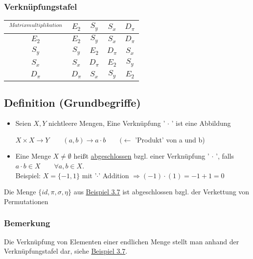 \documentclass[12pt,titlepage, pdf]{article}
\newcommand{\uline}[1]{\underline{#1}}
\renewcommand{\>}{\rightarrow}
\renewcommand{\*}{\cdot}
\begin{document}
	\\
	\\
	\subsubsection*{Verknüpfungstafel}
	\begin{tabular}{c | c c c c}
		$\overset{Matrixmultiplikation}{\cdot} $ & $E_2$ & $S_y $ & $S_x$ & $D_\pi$ \\ \hline
		$E_2$ & $E_2$ & $S_y$ & $S_x$ & $D_ \pi$ \\
		$S_y$ & $S_y$ & $E_2$ & $D_\pi$ & $S_x$ \\
		$S_x$ & $S_x$ & $D_\pi$ & $E_2$ & $S_y$ \\
		$D_\pi$ & $D_\pi$ & $S_x$ & $S_y$ & $E_2$ \\
	\end{tabular}
	\subsection{Definition (Grundbegriffe)}
	\begin{itemize}
		\item Seien $X,Y$ nichtleere Mengen, Eine Verknüpfung ' $\cdot$ ' ist eine Abbildung
		\begin{center}
			$X \times X \rightarrow Y\qquad (a,b) \rightarrow a \cdot b  \qquad( \leftarrow$ 'Produkt' von a und b)
		\end{center}
		\item Eine Menge $X \neq \emptyset$ heißt \uline{abgeschlossen} bzgl. einer Verknüpfung ' $\cdot$ ', falls $a \cdot b \in  X \qquad \forall a,b \in X$. \\
		Beispiel: $X=\{-1,1\}$ mit '$\*$' Addition $\Rightarrow(-1)\*(1)=-1+1=0$
	\end{itemize}
	Die Menge $\{id, \pi ,\sigma, \eta \}$ aus \hyperref[3.7]{Beispiel 3.7} ist abgeschlossen bzgl. der Verkettung von Permutationen \\
	\subsubsection*{Bemerkung} Die Verknüpfung von Elementen einer endlichen Menge stellt man anhand der Verknüpfungstafel dar, siehe \hyperref[3.7]{Beispiel 3.7}.
\end{document}
